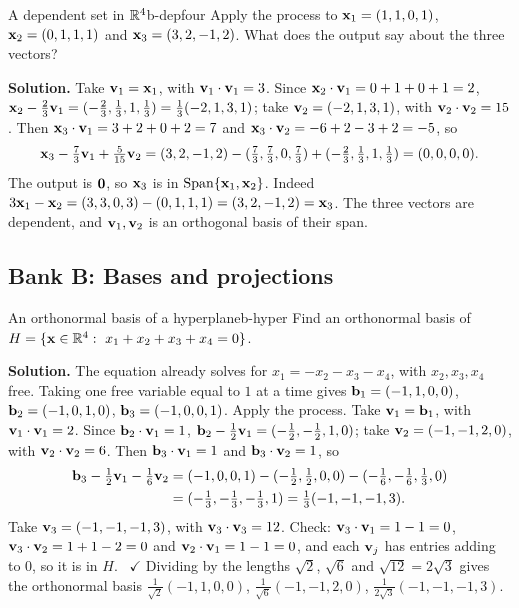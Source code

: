 \documentclass[11pt]{article}
\begin{document}
\begin{exmp}{A dependent set in $\mathbb{R}^4$}{b-depfour}
Apply the process to $\mathbf{x}_1=(1,1,0,1)$, $\mathbf{x}_2=(0,1,1,1)$ and $\mathbf{x}_3=(3,2,-1,2)$. What does the output say about the three vectors?

\textbf{Solution.} Take $\mathbf{v}_1=\mathbf{x}_1$, with $\mathbf{v}_1\cdot\mathbf{v}_1=3$. Since $\mathbf{x}_2\cdot\mathbf{v}_1=0+1+0+1=2$, $\mathbf{x}_2-\tfrac23\mathbf{v}_1=(-\tfrac23,\tfrac13,1,\tfrac13)=\tfrac13(-2,1,3,1)$; take $\mathbf{v}_2=(-2,1,3,1)$, with $\mathbf{v}_2\cdot\mathbf{v}_2=15$. Then $\mathbf{x}_3\cdot\mathbf{v}_1=3+2+0+2=7$ and $\mathbf{x}_3\cdot\mathbf{v}_2=-6+2-3+2=-5$, so
\[
\mathbf{x}_3-\tfrac73\mathbf{v}_1+\tfrac5{15}\mathbf{v}_2=(3,2,-1,2)-(\tfrac73,\tfrac73,0,\tfrac73)+(-\tfrac23,\tfrac13,1,\tfrac13)=(0,0,0,0).
\]
The output is $\mathbf{0}$, so $\mathbf{x}_3$ is in $\operatorname{Span}\{\mathbf{x}_1,\mathbf{x}_2\}$. Indeed $3\mathbf{x}_1-\mathbf{x}_2=(3,3,0,3)-(0,1,1,1)=(3,2,-1,2)=\mathbf{x}_3$. The three vectors are dependent, and $\mathbf{v}_1,\mathbf{v}_2$ is an orthogonal basis of their span.
\end{exmp}

\subsection*{Bank B: Bases and projections}
\begin{exmp}{An orthonormal basis of a hyperplane}{b-hyper}
Find an orthonormal basis of $H=\{\bv{x}\in\R^4:\ x_1+x_2+x_3+x_4=0\}$.

\textbf{Solution.} The equation already solves for $x_1=-x_2-x_3-x_4$, with $x_2,x_3,x_4$ free. Taking one free variable equal to $1$ at a time gives $\mathbf{b}_1=(-1,1,0,0)$, $\mathbf{b}_2=(-1,0,1,0)$, $\mathbf{b}_3=(-1,0,0,1)$. Apply the process. Take $\mathbf{v}_1=\mathbf{b}_1$, with $\mathbf{v}_1\cdot\mathbf{v}_1=2$. Since $\mathbf{b}_2\cdot\mathbf{v}_1=1$, $\mathbf{b}_2-\tfrac12\mathbf{v}_1=(-\tfrac12,-\tfrac12,1,0)$; take $\mathbf{v}_2=(-1,-1,2,0)$, with $\mathbf{v}_2\cdot\mathbf{v}_2=6$. Then $\mathbf{b}_3\cdot\mathbf{v}_1=1$ and $\mathbf{b}_3\cdot\mathbf{v}_2=1$, so
\[
\begin{aligned}\mathbf{b}_3-\tfrac12\mathbf{v}_1-\tfrac16\mathbf{v}_2&=(-1,0,0,1)-(-\tfrac12,\tfrac12,0,0)-(-\tfrac16,-\tfrac16,\tfrac13,0)\\&=(-\tfrac13,-\tfrac13,-\tfrac13,1)=\tfrac13(-1,-1,-1,3).\end{aligned}
\]
Take $\mathbf{v}_3=(-1,-1,-1,3)$, with $\mathbf{v}_3\cdot\mathbf{v}_3=12$. Check: $\mathbf{v}_3\cdot\mathbf{v}_1=1-1=0$, $\mathbf{v}_3\cdot\mathbf{v}_2=1+1-2=0$ and $\mathbf{v}_2\cdot\mathbf{v}_1=1-1=0$, and each $\mathbf{v}_j$ has entries adding to $0$, so it is in $H$. \ $\checkmark$ Dividing by the lengths $\sqrt2$, $\sqrt6$ and $\sqrt{12}=2\sqrt3$ gives the orthonormal basis $\tfrac1{\sqrt2}(-1,1,0,0)$, $\tfrac1{\sqrt6}(-1,-1,2,0)$, $\tfrac1{2\sqrt3}(-1,-1,-1,3)$.
\end{exmp}
\end{document}
